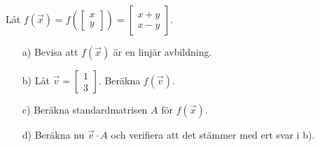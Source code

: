 Låt $f(\vec{x}) = f(\begin{bmatrix}x \\ y\end{bmatrix}) = \begin{bmatrix}x + y \\ x - y\end{bmatrix}$. 
\begin{itemize}
	\item[a) ] Bevisa att $f(\vec{x})$ är en linjär avbildning.
	\item[b) ] Låt $\vec{v} = \begin{bmatrix}1 \\ 3\end{bmatrix}$. Beräkna $f(\vec{v})$. 
	\item[c) ] Beräkna standardmatrisen $A$ för $f(\vec{x})$. 
	\item[d) ] Beräkna nu $\vec{v} \cdot A$ och verifiera att det stämmer med ert svar i b). 
\end{itemize}